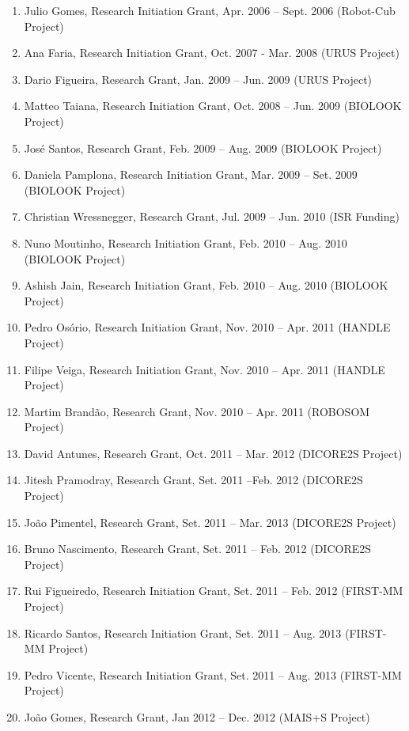 \documentclass[
]{article}
\begin{document}
\begin{enumerate}
\def\labelenumi{\arabic{enumi}.}
\item
  Julio Gomes, Research Initiation Grant, Apr. 2006 -- Sept. 2006
  (Robot-Cub Project)
\item
  Ana Faria, Research Initiation Grant, Oct. 2007 - Mar. 2008 (URUS
  Project)
\item
  Dario Figueira, Research Grant, Jan. 2009 -- Jun. 2009 (URUS Project)
\item
  Matteo Taiana, Research Initiation Grant, Oct. 2008 -- Jun. 2009
  (BIOLOOK Project)
\item
  José Santos, Research Grant, Feb. 2009 -- Aug. 2009 (BIOLOOK Project)
\item
  Daniela Pamplona, Research Initiation Grant, Mar. 2009 -- Set. 2009
  (BIOLOOK Project)
\item
  Christian Wressnegger, Research Grant, Jul. 2009 -- Jun. 2010 (ISR
  Funding)
\item
  Nuno Moutinho, Research Initiation Grant, Feb. 2010 -- Aug. 2010
  (BIOLOOK Project)
\item
  Ashish Jain, Research Initiation Grant, Feb. 2010 -- Aug. 2010
  (BIOLOOK Project)
\item
  Pedro Osório, Research Initiation Grant, Nov. 2010 -- Apr. 2011
  (HANDLE Project)
\item
  Filipe Veiga, Research Initiation Grant, Nov. 2010 -- Apr. 2011
  (HANDLE Project)
\item
  Martim Brandão, Research Grant, Nov. 2010 -- Apr. 2011 (ROBOSOM
  Project)
\item
  David Antunes, Research Grant, Oct. 2011 -- Mar. 2012 (DICORE2S
  Project)
\item
  Jitesh Pramodray, Research Grant, Set. 2011 --Feb. 2012 (DICORE2S
  Project)
\item
  João Pimentel, Research Grant, Set. 2011 -- Mar. 2013 (DICORE2S
  Project)
\item
  Bruno Nascimento, Research Grant, Set. 2011 -- Feb. 2012 (DICORE2S
  Project)
\item
  Rui Figueiredo, Research Initiation Grant, Set. 2011 -- Feb. 2012
  (FIRST-MM Project)
\item
  Ricardo Santos, Research Initiation Grant, Set. 2011 -- Aug. 2013
  (FIRST-MM Project)
\item
  Pedro Vicente, Research Initiation Grant, Set. 2011 -- Aug. 2013
  (FIRST-MM Project)
\item
  João Gomes, Research Grant, Jan 2012 -- Dec. 2012 (MAIS+S Project)

\end{enumerate}
\end{document}
